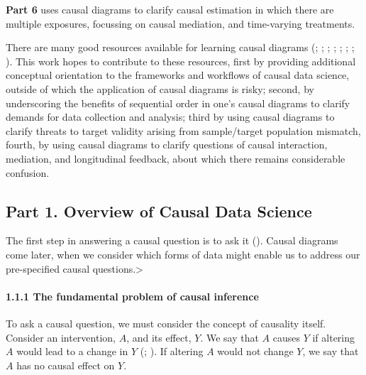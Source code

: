 \documentclass[
  singlecolumn]{article}
\let\oldparagraph\paragraph
\renewcommand{\paragraph}[1]{\oldparagraph{#1}\mbox{}}
\begin{document}
\textbf{Part 6} uses causal diagrams to clarify causal estimation in
which there are multiple exposures, focussing on causal mediation, and
time-varying treatments.

There are many good resources available for learning causal diagrams
(;
;
;
;
;
; ; ). This work
hopes to contribute to these resources, first by providing additional
conceptual orientation to the frameworks and workflows of causal data
science, outside of which the application of causal diagrams is risky;
second, by underscoring the benefits of sequential order in one's causal
diagrams to clarify demands for data collection and analysis; third by
using causal diagrams to clarify threats to target validity arising from
sample/target population mismatch, fourth, by using causal diagrams to
clarify questions of causal interaction, mediation, and longitudinal
feedback, about which there remains considerable confusion.

\subsection{Part 1. Overview of Causal Data
Science}\label{part-1.-overview-of-causal-data-science}

The first step in answering a causal question is to ask it
(). Causal
diagrams come later, when we consider which forms of data might enable
us to address our pre-specified causal questions.\textgreater{}

\paragraph{1.1.1 The fundamental problem of causal
inference}\label{the-fundamental-problem-of-causal-inference}

To ask a causal question, we must consider the concept of causality
itself. Consider an intervention, \(A\), and its effect, \(Y\). We say
that \(A\) causes \(Y\) if altering \(A\) would lead to a change in
\(Y\) (;
). If altering \(A\) would not
change \(Y\), we say that \(A\) has no causal effect on \(Y\).
\end{document}
